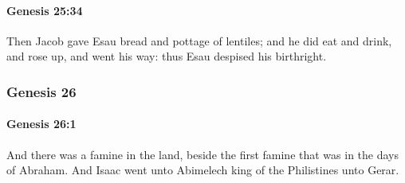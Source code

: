 		\paragraph{Genesis 25:34} %
			\label{GENESIS-25-34}

			Then Jacob gave Esau bread and pottage of lentiles; and he did eat and drink, and rose up, and went his way: thus Esau despised his birthright.

	\subsubsection{Genesis 26} %
		\label{GENESIS-26}

		\paragraph{Genesis 26:1} %
			\label{GENESIS-26-1}

			And there was a famine in the land, beside the first famine that was in the days of Abraham. And Isaac went unto Abimelech king of the Philistines unto Gerar.

